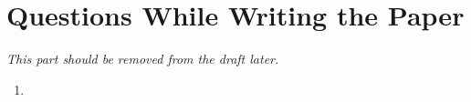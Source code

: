 \section*{Questions While Writing the Paper}

\emph{This part should be removed from the draft later.}

\begin{enumerate}
    \item  
\end{enumerate}